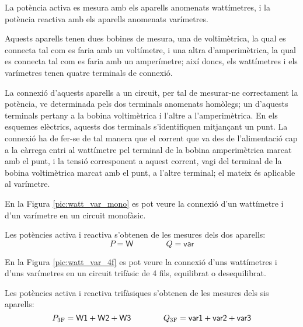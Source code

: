La potència activa es mesura amb els aparells anomenats wattímetres,
i la potència reactiva amb els aparells anomenats varímetres.

Aquests aparells tenen dues bobines de mesura, una de voltimètrica,
la qual es connecta tal com es faria amb un voltímetre, i una altra
d'amperimètrica, la qual es connecta tal com es faria amb un
amperímetre; així doncs, els wattímetres i els varímetres tenen
quatre terminals de connexió.

La connexió d'aquests aparells a un circuit, per tal de
mesurar-ne correctament la potència, ve determinada pels dos terminals
anomenats homòlegs; un d'aquests terminals pertany a la bobina
voltimètrica i l'altre a l'amperimètrica. En els esquemes elèctrics,
aquests dos terminals s'identifiquen mitjançant un punt. La connexió
ha de fer-se de tal manera que el corrent que va des de
l'alimentació cap a la càrrega entri al wattímetre pel terminal de
la bobina amperimètrica marcat amb el punt, i la tensió corresponent
a aquest corrent, vagi del terminal de la bobina voltimètrica marcat
amb el punt, a l'altre terminal; el mateix és aplicable al
varímetre.

En la Figura \vref{pic:watt_var_mono} es pot veure la connexió d'un
wattímetre i d'un varímetre en un circuit monofàsic.


\begin{center}
    
    \label{pic:watt_var_mono}
\end{center}

Les potències activa i reactiva s'obtenen de les mesures dels dos
aparells:
\begin{equation}
    P = \textsf{W} \qquad\qquad Q = \textsf{var}
\end{equation}

En la Figura \vref{pic:watt_var_4f} es pot veure la connexió d'uns
wattímetres i d'uns varímetres en un circuit trifàsic de 4 fils,
equilibrat o desequilibrat.

\begin{center}
    
    \label{pic:watt_var_4f}
\end{center}

Les potències activa i reactiva trifàsiques s'obtenen de les mesures
dels sis aparells:
\begin{equation}
    P_\mathrm{3F} = \textsf{W1} +  \textsf{W2} + \textsf{W3}
    \qquad\qquad Q_\mathrm{3F} = \textsf{var1} +  \textsf{var2} + \textsf{var3}
\end{equation}

